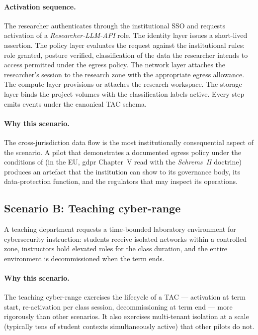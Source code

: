 \paragraph{Activation sequence.} The researcher authenticates
through the institutional SSO and requests activation of a
\emph{Researcher-LLM-API} role. The identity layer issues a
short-lived assertion. The policy layer evaluates the request
against the institutional rules: role granted, posture verified,
classification of the data the researcher intends to access
permitted under the egress policy. The network layer attaches the
researcher's session to the research zone with the appropriate
egress allowance. The compute layer provisions or attaches the
research workspace. The storage layer binds the project volumes
with the classification labels active. Every step emits events
under the canonical TAC schema.

\paragraph{Why this scenario.} The cross-jurisdiction data flow is
the most institutionally consequential aspect of the scenario. A
pilot that demonstrates a documented egress policy under the
conditions of  (in the EU,
\gls{gdpr} Chapter~V read with the \emph{Schrems~II} doctrine)
produces an artefact that the
institution can show to its governance body, its data-protection
function, and the regulators that may inspect its operations.

\subsection{Scenario B: Teaching cyber-range}
\label{sec:w5-scenario-cyber}

A teaching department requests a time-bounded laboratory
environment for cybersecurity instruction: students receive
isolated networks within a controlled zone, instructors hold
elevated roles for the class duration, and the entire environment
is decommissioned when the term ends.

\paragraph{Why this scenario.} The teaching cyber-range exercises
the lifecycle of a TAC --- activation at term start,
re-activation per class session, decommissioning at term end ---
more rigorously than other scenarios. It also exercises
multi-tenant isolation at a scale (typically tens of student
contexts simultaneously active) that other pilots do not.

